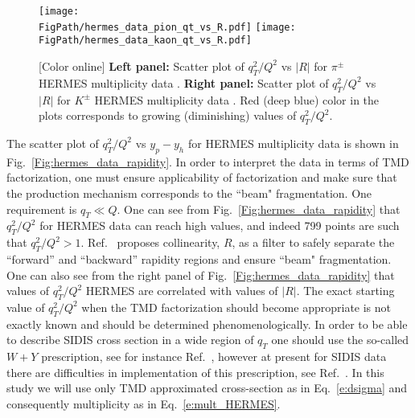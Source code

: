 \documentclass[final,3p,times,onecolumn,sort&compress,hidelinks]{elsarticle}
\newcommand\3[1]{\boldsymbol{#1}}
\newcommand*{\FigPath}{../Figs/}%
\begin{document}
\begin{figure}[htb!]
\centering
\texttt{[image: \\FigPath/hermes\_data\_pion\_qt\_vs\_R.pdf]}
\texttt{[image: \\FigPath/hermes\_data\_kaon\_qt\_vs\_R.pdf]}
\caption{\label{Fig:hermes_data_qt_vs_R}
[Color online] {\bf Left panel:} Scatter plot of $q_T^2/Q^2$ vs $|R|$ for $\pi^\pm$ HERMES multiplicity data . {\bf Right panel:} 
Scatter plot of $q_T^2/Q^2$ vs $|R|$ for $K^\pm$ HERMES multiplicity data . Red (deep blue) color in the plots corresponds to growing (diminishing) values of $q_T^2/Q^2$.
}
\end{figure}
The scatter plot of  $q_T^2/Q^2$ vs $y_p-y_h$ for HERMES multiplicity data is shown in Fig.~\ref{Fig:hermes_data_rapidity}. In order to interpret the data in terms of TMD factorization, one must ensure applicability of factorization and make sure that the production mechanism corresponds to the ``beam" fragmentation. One requirement is $q_T \ll Q$. One can see from Fig.~\ref{Fig:hermes_data_rapidity} that  $q_T^2/Q^2$ for HERMES data can reach high values, and indeed 799 points are such that $q_T^2/Q^2>1$. Ref.~\cite{Boglione:2016bph} proposes collinearity, $R$, as a filter to  safely separate the ``forward'' and ``backward'' rapidity regions and ensure ``beam" fragmentation. One can also see from the right panel of Fig.~\ref{Fig:hermes_data_rapidity}  that values of $q_T^2/Q^2$ HERMES are correlated with values of $|R|$.
The exact starting value of $q_T^2/Q^2$ when the TMD factorization should become appropriate is not exactly known and should be determined phenomenologically. In order to be able to describe SIDIS cross section in a wide region of $q_T$ one should use the so-called $W+Y$ prescription, see for instance Ref.~\cite{Collins:2016hqq}, however at present for SIDIS data there are difficulties in implementation of this prescription, see Ref.~\cite{Gonzalez-Hernandez:2018ipj}. In this study we will use only TMD approximated cross-section as in Eq.~\eqref{e:dsigma} and consequently multiplicity as in Eq.~\eqref{e:mult_HERMES}.
\end{document}
